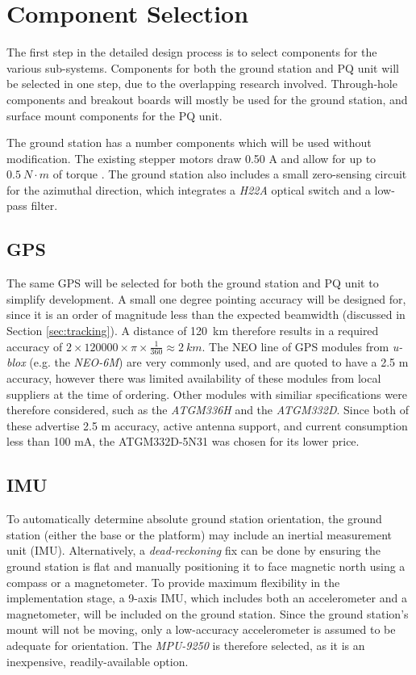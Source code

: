 \graphicspath{{./figures}}

\section{Component Selection}
The first step in the detailed design process is to select components for the various sub-systems. Components for both the ground station and PQ unit will be selected in one step, due to the overlapping research involved. Through-hole components and breakout boards will mostly be used for the ground station, and surface mount components for the PQ unit.

The ground station has a number components which will be used without modification. The existing stepper motors draw 0.50 A and allow for up to $\SI{0.5}{N \cdot m}$ of torque \cite{datasheet-4118}. The ground station also includes a small zero-sensing circuit for the azimuthal direction, which integrates a \textit{H22A} optical switch \cite{datasheet-H22A1} and a low-pass filter.

\subsection{GPS}\label{sec:components_gps}
The same GPS will be selected for both the ground station and PQ unit to simplify development. A small one degree pointing accuracy will be designed for, since it is an order of magnitude less than the expected beamwidth (discussed in Section \ref{sec:tracking}). A distance of \SI{120}{km} therefore results in a required accuracy of $2 \times 120 000 \times \pi \times \frac{1}{360} \approx \SI{2}{km}$. The NEO line of GPS modules from \textit{u-blox} (e.g. the \textit{NEO-6M}) are very commonly used, and are quoted to have a 2.5 m accuracy, however there was limited availability of these modules from local suppliers at the time of ordering. Other modules with similiar specifications were therefore considered, such as the \textit{ATGM336H} and the \textit{ATGM332D}. Since both of these advertise 2.5 m accuracy, active antenna support, and current consumption less than 100 mA, the ATGM332D-5N31 was chosen for its lower price.

\subsection{IMU}
To automatically determine absolute ground station orientation, the ground station (either the base or the platform) may include an inertial measurement unit (IMU). Alternatively, a \textit{dead-reckoning} fix can be done by ensuring the ground station is flat and manually positioning it to face magnetic north using a compass or a magnetometer. To provide maximum flexibility in the implementation stage, a 9-axis IMU, which includes both an accelerometer and a magnetometer, will be included on the ground station. Since the ground station's mount will not be moving, only a low-accuracy accelerometer is assumed to be adequate for orientation. The \textit{MPU-9250} is therefore selected, as it is an inexpensive, readily-available option.

